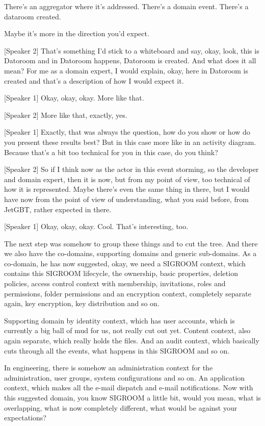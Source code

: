 There's an aggregator where it's addressed. There's a domain event. There's a dataroom created.

Maybe it's more in the direction you'd expect.

[Speaker 2]
That's something I'd stick to a whiteboard and say, okay, look, this is Datoroom and in Datoroom happens, Datoroom is created. And what does it all mean? For me as a domain expert, I would explain, okay, here in Datoroom is created and that's a description of how I would expect it.

[Speaker 1]
Okay, okay, okay. More like that.

[Speaker 2]
More like that, exactly, yes.

[Speaker 1]
Exactly, that was always the question, how do you show or how do you present these results best? But in this case more like in an activity diagram. Because that's a bit too technical for you in this case, do you think?

[Speaker 2]
So if I think now as the actor in this event storming, so the developer and domain expert, then it is now, but from my point of view, too technical of how it is represented. Maybe there's even the same thing in there, but I would have now from the point of view of understanding, what you said before, from JetGBT, rather expected in there.

[Speaker 1]
Okay, okay, okay. Cool. That's interesting, too.

The next step was somehow to group these things and to cut the tree. And there we also have the co-domains, supporting domains and generic sub-domains. As a co-domain, he has now suggested, okay, we need a SIGROOM context, which contains this SIGROOM lifecycle, the ownership, basic properties, deletion policies, access control context with membership, invitations, roles and permissions, folder permissions and an encryption context, completely separate again, key encryption, key distribution and so on.

Supporting domain by identity context, which has user accounts, which is currently a big ball of mud for us, not really cut out yet. Content context, also again separate, which really holds the files. And an audit context, which basically cuts through all the events, what happens in this SIGROOM and so on.

In engineering, there is somehow an administration context for the administration, user groups, system configurations and so on. An application context, which makes all the e-mail dispatch and e-mail notifications. Now with this suggested domain, you know SIGROOM a little bit, would you mean, what is overlapping, what is now completely different, what would be against your expectations?

